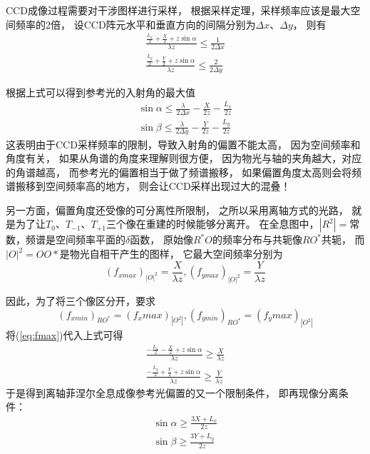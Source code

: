 \documentclass[11pt,a4paper]{article}
\begin{document}
CCD成像过程需要对干涉图样进行采样，
根据采样定理，采样频率应该是最大空间频率的2倍，
设CCD阵元水平和垂直方向的间隔分别为$\Delta x、\Delta y$，
则有
\begin{equation}
\begin{split}
\frac{\frac{L_x}{2}+\frac{X}{2}+z\sin\alpha}{\lambda z} \le \frac{1}{2\Delta x} \\
\frac{\frac{L_y}{2}+\frac{Y}{2}+z\sin\alpha}{\lambda z} \le \frac{2}{2\Delta y}
\end{split}
\end{equation}

根据上式可以得到参考光的入射角的最大值
\begin{equation}
\begin{split}
\sin\alpha\le\frac{\lambda}{2\Delta x}-\frac{X}{2z}-\frac{L_x}{2z} \\
\sin\beta\le\frac{\lambda}{2\Delta y}-\frac{Y}{2z}-\frac{L_y}{2z}
\end{split}
\label{eq:max_angle}
\end{equation}
这表明由于CCD采样频率的限制，导致入射角的偏置不能太高，
因为空间频率和角度有关，
如果从角谱的角度来理解则很方便，
因为物光与轴的夹角越大，对应的角谱越高，
而参考光的偏置相当于做了频谱搬移，
如果偏置角度太高则会将频谱搬移到空间频率高的地方，
则会让CCD采样出现过大的混叠！

另一方面，偏置角度还受像的可分离性所限制，
之所以采用离轴方式的光路，
就是为了让$T_0、T_{-1}、T_{+1}$三个像在重建的时候能够分离开。
在全息图中，$|R^2|=$常数，频谱是空间频率平面的$\delta$函数，
原始像$R^*O$的频率分布与共轭像$RO^*$共轭，
而$|O|^2=OO*$是物光自相干产生的图样，
它最大空间频率分别为\cite{goodman2006傅里叶光学导论}
\begin{equation}
(f_{xmax})_{|O|^2} =\frac{X}{\lambda z}, 
(f_{ymax})_{|O|^2} =\frac{Y}{\lambda z}
\end{equation}

因此，为了将三个像区分开，要求
\begin{equation}
(f_{xmin})_{RO^*}= (f_xmax)_{|O^2|},
(f_{ymin})_{RO^*}= (f_ymax)_{|O^2|}
\end{equation}
将(\ref{eq:fmax})代入上式可得
\begin{equation}
\begin{split}
\frac{-\frac{L_x}{2}-\frac{X}{2}+z\sin\alpha}{\lambda z} \ge \frac{X}{\lambda z}\\
\frac{-\frac{L_y}{2}+\frac{Y}{2}+z\sin\alpha}{\lambda z} \ge \frac{Y}{\lambda z}
\end{split}
\end{equation}
于是得到离轴菲涅尔全息成像参考光偏置的又一个限制条件，
即再现像分离条件：
\begin{equation}
\begin{split}
\sin \alpha \ge \frac{3X+L_x}{2z} \\
\sin \beta \ge \frac{3Y+L_y}{2z}
\end{split}
\label{eq:min_angle}
\end{equation}
\end{document}

